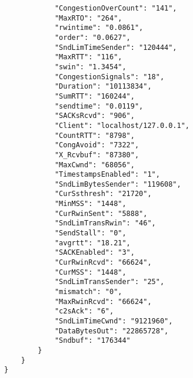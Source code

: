 \begin{verbatim}
            "CongestionOverCount": "141",
            "MaxRTO": "264",
            "rwintime": "0.0861",
            "order": "0.0627",
            "SndLimTimeSender": "120444",
            "MaxRTT": "116",
            "swin": "1.3454",
            "CongestionSignals": "18",
            "Duration": "10113834",
            "SumRTT": "160244",
            "sendtime": "0.0119",
            "SACKsRcvd": "906",
            "Client": "localhost/127.0.0.1",
            "CountRTT": "8798",
            "CongAvoid": "7322",
            "X_Rcvbuf": "87380",
            "MaxCwnd": "68056",
            "TimestampsEnabled": "1",
            "SndLimBytesSender": "119608",
            "CurSsthresh": "21720",
            "MinMSS": "1448",
            "CurRwinSent": "5888",
            "SndLimTransRwin": "46",
            "SendStall": "0",
            "avgrtt": "18.21",
            "SACKEnabled": "3",
            "CurRwinRcvd": "66624",
            "CurMSS": "1448",
            "SndLimTransSender": "25",
            "mismatch": "0",
            "MaxRwinRcvd": "66624",
            "c2sAck": "6",
            "SndLimTimeCwnd": "9121960",
            "DataBytesOut": "22865728",
            "Sndbuf": "176344"
        }
    }
}
\end{verbatim}
